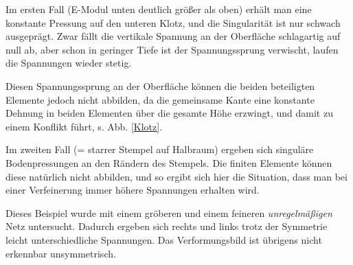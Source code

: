 {{Im ersten Fall (E-Modul unten deutlich gr\"{o}{\ss}er als oben) erh\"{a}lt man eine konstante Pressung auf den unteren Klotz, und die Singularit\"{a}t ist nur schwach ausgepr\"{a}gt. Zwar f\"{a}llt die vertikale Spannung an der Oberfl\"{a}che schlagartig auf null ab, aber schon in geringer Tiefe ist der Spannungssprung verwischt, laufen die Spannungen wieder stetig.

Diesen Spannungssprung an der Oberfl\"{a}che k\"{o}nnen die beiden beteiligten Elemente jedoch nicht abbilden, da die gemeinsame Kante eine konstante Dehnung in beiden Elementen \"{u}ber die gesamte H\"{o}he erzwingt, und damit zu einem Konflikt f\"{u}hrt, s. Abb. \ref{Klotz}.

Im zweiten Fall (= starrer Stempel auf Halbraum) ergeben sich singul\"{a}re Bodenpressungen an den R\"{a}ndern des Stempels. Die finiten Elemente k\"{o}nnen diese nat\"{u}rlich nicht abbilden, und so ergibt sich hier die Situation, dass man bei einer Verfeinerung immer h\"{o}here Spannungen erhalten wird.

Dieses Beispiel wurde mit einem gr\"{o}beren und einem feineren {\em unregelm\"{a}{\ss}igen\/} Netz untersucht. Dadurch ergeben sich rechts und links trotz der Symmetrie leicht unterschiedliche Spannungen. Das Verformungsbild ist \"{u}brigens nicht erkennbar unsymmetrisch.

}}
